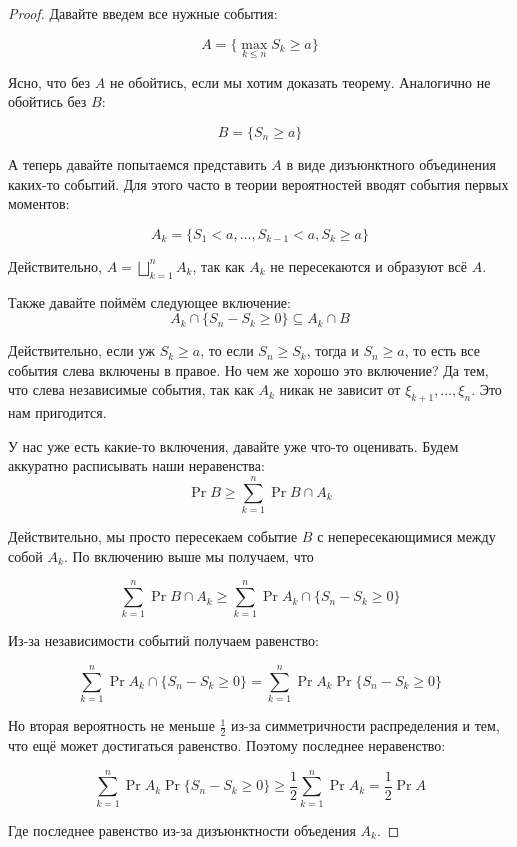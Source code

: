 \begin{proof}
  Давайте введем все нужные события:

  \[
    A = \{\max\limits_{k \leq n} S_k \geq a\}
  \]

  Ясно, что без $A$ не обойтись, если мы хотим доказать теорему. Аналогично
  не обойтись без $B$:

  \[
    B = \{S_n \geq a\}
  \]

  А теперь давайте попытаемся представить $A$ в виде дизъюнктного объединения
  каких-то событий. Для этого часто в теории вероятностей вводят события первых
  моментов:

  \[
    A_k = \{S_1 < a, \ldots, S_{k - 1} < a, S_k \geq a\}
  \]

  Действительно, $A = \bigsqcup\limits_{k = 1}^n A_k$, так как
  $A_k$ не пересекаются и образуют всё $A$.

  Также давайте поймём следующее включение:
  \[
    A_k \cap \{S_n - S_k \geq 0\} \subseteq A_k \cap B
  \]

  Действительно, если уж $S_k \geq a$, то если $S_n \geq S_k$, тогда и
  $S_n \geq a$, то есть все события слева включены в правое. Но чем же хорошо
  это включение? Да тем, что слева независимые события, так как
  $A_k$ никак не зависит от $\xi_{k + 1}, \ldots, \xi_n$. Это нам пригодится.

  У нас уже
  есть какие-то включения, давайте уже что-то оценивать. Будем аккуратно
  расписывать наши неравенства:
  \[
    \Pr{B} \geq \sum\limits_{k = 1}^n \Pr{B \cap A_k}
  \]

  Действительно, мы просто пересекаем событие $B$ с непересекающимися между
  собой $A_k$. По включению выше мы получаем, что 

  \[
    \sum\limits_{k = 1}^n \Pr{B \cap A_k} \geq \sum\limits_{k = 1}^n \Pr{A_k
    \cap \{S_n - S_k \geq 0\}}
  \]

  Из-за независимости событий получаем равенство:

  \[
    \sum\limits_{k = 1}^n \Pr{A_k \cap \{S_n - S_k \geq 0\}} = 
    \sum\limits_{k = 1}^n \Pr{A_k} \Pr{\{S_n - S_k \geq 0\}}
  \]

  Но вторая вероятность не меньше $\frac12$ из-за симметричности распределения
  и тем, что ещё может достигаться равенство. Поэтому последнее неравенство:

  \[
    \sum\limits_{k = 1}^n \Pr{A_k} \Pr{\{S_n - S_k \geq 0\}} \geq
    \frac12\sum\limits_{k = 1}^n \Pr{A_k} = \frac12 \Pr{A}
  \]

  Где последнее равенство из-за дизъюнктности объедения $A_k$.
\end{proof}


